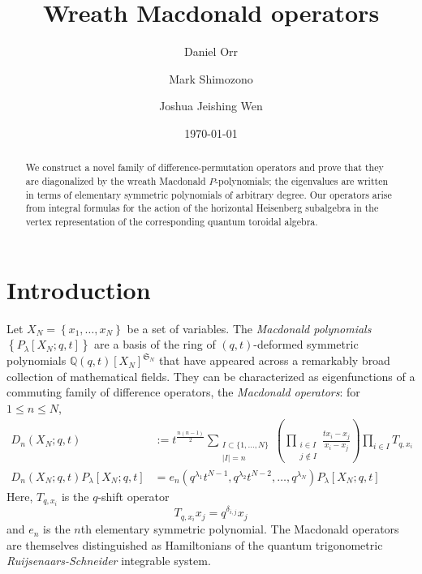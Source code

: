 \documentclass{amsart}
\newcommand{\Q}{\mathbb{Q}}
\newcommand{\Sym}{\mathfrak{S}}
\theoremstyle{remark}
\numberwithin{thm}{section}
\numberwithin{equation}{section}
\begin{document}
\title{Wreath Macdonald operators}
\author{Daniel Orr}\address{Orr:
Department of Mathematics (MC 0123),
	460 McBryde Hall, Virginia Tech,
	225 Stanger St.,
	Blacksburg, VA 24061 USA /
Max Planck Institut f\"{u}r Mathematik, Vivatsgasse 7,
53111 Bonn,
Germany}
\author{Mark Shimozono}\address{Shimozono: Department of Mathematics (MC 0123),
	460 McBryde Hall, Virginia Tech,
	225 Stanger St.,
	Blacksburg, VA 24061 USA}
\author{Joshua Jeishing Wen}\address{Wen: Department of Mathematics, Northeastern University, 463 Lake Hall, 43 Leon St, Boston, MA 02115}
\date{\today}
\maketitle

\begin{abstract}
We construct a novel family of difference-permutation operators and prove that they are diagonalized by the wreath Macdonald $P$-polynomials; the eigenvalues are written in terms of elementary symmetric polynomials of arbitrary degree. Our operators arise from integral formulas for the action of the horizontal Heisenberg subalgebra in the vertex representation of the corresponding quantum toroidal algebra.
\end{abstract}

\section{Introduction}
Let $X_{N}=\left\{ x_{1},\ldots, x_N \right\}$ be a set of variables.
The \textit{Macdonald polynomials} $\left\{ P_\lambda[X_N;q,t] \right\}$ are a basis of the ring of $(q,t)$-deformed symmetric polynomials $\Q(q,t)[X_N]^{\Sym_N}$ that have appeared across a remarkably broad collection of mathematical fields.
They can be characterized as eigenfunctions of a commuting family of difference operators, the \textit{Macdonald operators}: for $1\le n\le N$,
\begin{align}
\label{OldMacOp}
D_n(X_N ;q,t)&:=t^{\frac{n(n-1)}{2}}\sum_{\substack{I\subset\{1,\ldots, N\}\\|I|=n}}\left(\prod_{\substack{i\in I\\j\not\in I}}\frac{tx_i-x_j}{x_i-x_j}\right)\prod_{i\in I} T_{q,x_i}\\
\label{OldEigen}
D_n(X_N ;q,t) P_\lambda[X_N;q,t] &= e_n(q^{\lambda_1}t^{N-1}, q^{\lambda_2}t^{N-2},\ldots, q^{\lambda_N})P_\lambda[X_N ;q,t]
\end{align}
Here, $T_{q,x_i}$ is the $q$-shift operator %
\[
T_{q,x_i} x_j=q^{\delta_{i,j}}x_j
\]
and $e_n$ is the $n$th elementary symmetric polynomial.
The Macdonald operators are themselves distinguished as Hamiltonians of the quantum trigonometric \textit{Ruijsenaars-Schneider} integrable system.
\end{document}
